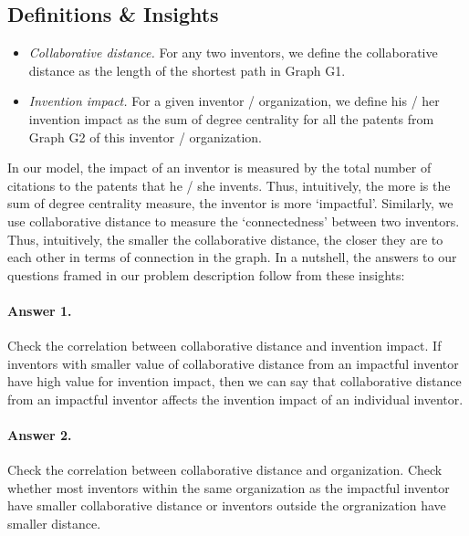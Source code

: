 \subsection{Definitions \& Insights}

	\begin{itemize}
		\item {\em Collaborative distance.} For any two inventors, we define
		the collaborative distance as the length of the shortest path in
		Graph G1.
		\item {\em Invention impact.} For a given inventor / organization, we define his /
		her invention impact as the sum of degree centrality for
		all the patents from Graph G2 of this inventor / organization.
	\end{itemize}


In our model, the impact of an inventor is measured by the total number of citations
to the patents that he / she invents. Thus, intuitively, the more is the sum of degree
centrality measure, the inventor is more `impactful'. Similarly, we use
collaborative distance to measure the `connectedness' between two inventors.
Thus, intuitively, the smaller the collaborative distance, the closer they are
to each other in terms of connection in the graph.  In a nutshell, the answers
to our questions framed in our problem description follow from these insights:

\paragraph{Answer 1.} Check the correlation between collaborative distance and invention impact.
If inventors with smaller value of collaborative distance from an impactful inventor have 
high value for invention impact, then we can say that collaborative distance from an impactful inventor
affects the invention impact of an individual inventor.

\paragraph{Answer 2.} Check the correlation between collaborative distance and organization.
Check whether most inventors within the same organization as the impactful inventor
have smaller collaborative distance or inventors outside the orgranization have
smaller distance.

